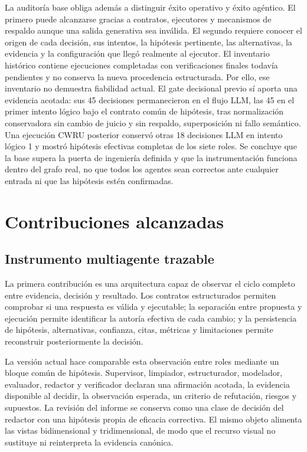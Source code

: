 La auditoría base obliga además a distinguir éxito operativo y éxito agéntico.
El primero puede alcanzarse gracias a contratos, ejecutores y mecanismos de
respaldo aunque una salida generativa sea inválida. El segundo requiere conocer
el origen de cada decisión, sus intentos, la hipótesis pertinente, las
alternativas, la evidencia y la configuración que llegó realmente al ejecutor.
El inventario histórico contiene ejecuciones completadas con verificaciones
finales todavía pendientes y no conserva la nueva procedencia estructurada. Por
ello, ese inventario no demuestra fiabilidad actual. El gate decisional previo sí
aporta una evidencia acotada: sus 45 decisiones permanecieron en el flujo LLM,
las 45 en el primer intento lógico bajo el contrato común de hipótesis, tras
normalización conservadora sin cambio de juicio y sin respaldo, superposición
ni fallo semántico. Una ejecución CWRU posterior conservó otras 18 decisiones
LLM en intento lógico 1 y mostró hipótesis efectivas completas de los siete
roles. Se concluye que la base supera la puerta de ingeniería definida y que la
instrumentación funciona dentro del grafo real, no que todos los agentes sean
correctos ante cualquier entrada ni que las hipótesis estén confirmadas.

\section{Contribuciones alcanzadas}

\subsection{Instrumento multiagente trazable}

La primera contribución es una arquitectura capaz de observar el ciclo
completo entre evidencia, decisión y resultado. Los contratos estructurados
permiten comprobar si una respuesta es válida y ejecutable; la separación entre
propuesta y ejecución permite identificar la autoría efectiva de cada cambio;
y la persistencia de hipótesis, alternativas, confianza, citas, métricas y
limitaciones permite reconstruir posteriormente la decisión.

La versión actual hace comparable esta observación entre roles mediante un
bloque común de hipótesis. Supervisor, limpiador, estructurador, modelador,
evaluador, redactor y verificador declaran una afirmación acotada, la evidencia
disponible al decidir, la observación esperada, un criterio de refutación,
riesgos y supuestos. La revisión del informe se conserva como una clase de
decisión del redactor con una hipótesis propia de eficacia correctiva. El mismo
objeto alimenta las vistas bidimensional y tridimensional, de modo que el
recurso visual no sustituye ni reinterpreta la evidencia canónica.

